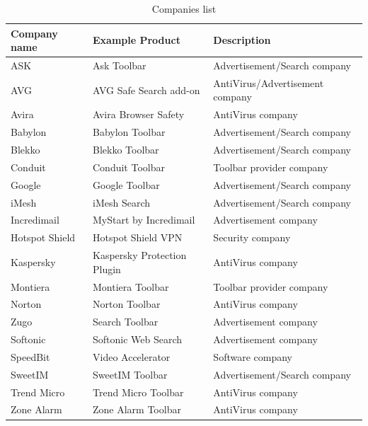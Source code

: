 \documentclass[11pt,oneside]{book}
\begin{document}
\begin{table}[h]
\centering
\caption{Companies list}
\label{table:companies_list}
\begin{tabular}{@{}lll@{}}
\toprule
{\bf Company name} & {\bf Example Product}               & {\bf Description}               \\ \midrule
ASK                & Ask Toolbar                 & Advertisement/Search company    \\
AVG                & AVG Safe Search add-on      & AntiVirus/Advertisement company \\
Avira              & Avira Browser Safety        & AntiVirus company               \\
Babylon            & Babylon Toolbar             & Advertisement/Search company    \\
Blekko             & Blekko Toolbar              & Advertisement/Search company    \\
Conduit            & Conduit Toolbar             & Toolbar provider company        \\
Google             & Google Toolbar              & Advertisement/Search company    \\
iMesh              & iMesh Search                & Advertisement/Search company    \\
Incredimail        & MyStart by Incredimail      & Advertisement company           \\
Hotspot Shield     & Hotspot Shield VPN          & Security company                \\
Kaspersky          & Kaspersky Protection Plugin & AntiVirus company               \\
Montiera           & Montiera Toolbar            & Toolbar provider company        \\
Norton             & Norton Toolbar              & AntiVirus company               \\
Zugo               & Search Toolbar              & Advertisement company           \\
Softonic           & Softonic Web Search         & Advertisement company           \\
SpeedBit           & Video Accelerator           & Software company                \\
SweetIM            & SweetIM Toolbar             & Advertisement/Search company    \\
Trend Micro        & Trend Micro Toolbar         & AntiVirus company               \\
Zone Alarm         & Zone Alarm Toolbar          & AntiVirus company               \\ \bottomrule
\end{tabular}
\end{table}
\end{document}
